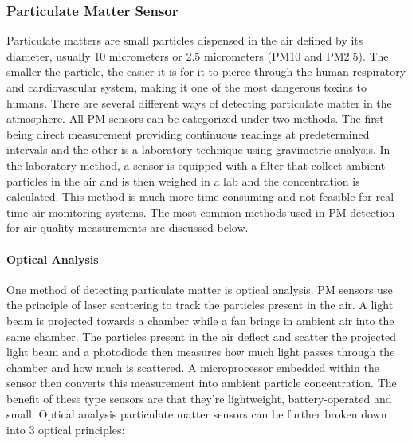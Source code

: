 


\subsubsection{Particulate Matter Sensor}
Particulate matters are small particles dispensed in the air defined by its diameter, usually 10 micrometers or 2.5 micrometers (PM10 and PM2.5). The smaller the particle, the easier it is for it to pierce through the human respiratory and cardiovascular system, making it one of the most dangerous toxins to humans. There are several different ways of detecting particulate matter in the atmosphere. All PM sensors can be categorized under two methods. The first being direct measurement providing continuous readings at predetermined intervals and the other is a laboratory technique using gravimetric analysis. In the laboratory method, a sensor is equipped with a filter that collect ambient particles in the air and is then weighed in a lab and the concentration is calculated. This method is much more time consuming and not feasible for real-time air monitoring systems. The most common methods used in PM detection for air quality measurements are discussed below.

\paragraph{Optical Analysis}
 One method of detecting particulate matter is optical analysis. PM sensors use the principle of laser scattering to track the particles present in the air. A light beam is projected towards a chamber while a fan brings in ambient air into the same chamber. The particles present in the air deflect and scatter the projected light beam and a photodiode then measures how much light passes through the chamber and how much is scattered. A microprocessor embedded within the sensor then converts this measurement into ambient particle concentration. The benefit of these type sensors are that they’re lightweight, battery-operated and small. Optical analysis particulate matter sensors can be further broken down into 3 optical principles:
  
